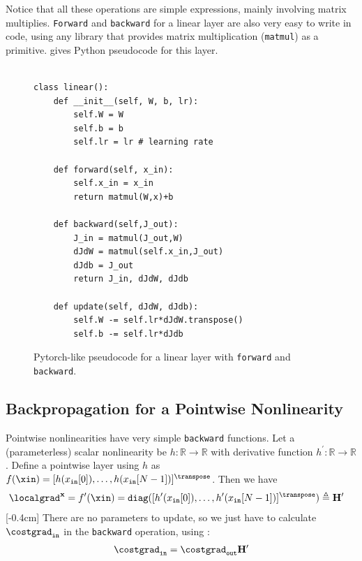 Notice that all these operations are simple expressions, mainly involving matrix multiplies. \texttt{Forward} and \texttt{backward} for a linear layer are also very easy to write in code, using any library that provides matrix multiplication (\texttt{matmul}) as a primitive. \Fig{\ref{fig:backpropagation:backprop_code}} gives Python pseudocode for this layer.
\begin{figure}[h]
\begin{minipage}{1.0\linewidth}
\begin{verbatim}

class linear():
    def __init__(self, W, b, lr):
        self.W = W
        self.b = b
        self.lr = lr # learning rate
        
    def forward(self, x_in):
        self.x_in = x_in
        return matmul(W,x)+b
    
    def backward(self,J_out):
        J_in = matmul(J_out,W)
        dJdW = matmul(self.x_in,J_out)
        dJdb = J_out
        return J_in, dJdW, dJdb
    
    def update(self, dJdW, dJdb):
        self.W -= self.lr*dJdW.transpose()
        self.b -= self.lr*dJdb
\end{verbatim}
\end{minipage}
\caption{Pytorch-like pseudocode for a linear layer with \texttt{forward} and \texttt{backward}.}
\label{fig:backpropagation:backprop_code}
\end{figure}


\subsection{Backpropagation for a Pointwise Nonlinearity}

Pointwise nonlinearities have very simple \texttt{backward} functions. Let a (parameterless) scalar nonlinearity be $h: \mathbb{R} \rightarrow \mathbb{R}$ with derivative function $h^{\prime}: \mathbb{R} \rightarrow \mathbb{R}$. Define a  pointwise layer using $h$ as $f(\xin) = [h(x_{\texttt{in}}[0]), \ldots, h(x_{\texttt{in}}[N-1])]^\transpose$. Then we have
\begin{align}
    \localgrad^{\mathbf{x}} &= f^{\prime}(\xin) = \texttt{diag}([h^\prime(x_{\texttt{in}}[0]), \ldots, h^\prime(x_{\texttt{in}}[N-1])]^\transpose) \triangleq \mathbf{H}^\prime
\end{align}
[-0.4cm]
There are no parameters to update, so we just have to calculate $\costgrad_{\texttt{in}}$ in the \texttt{backward} operation, using \eqn{\ref{eqn:backpropagation:backward}}:
\begin{align}
    \costgrad_{\texttt{in}} = \costgrad_{\texttt{out}}\mathbf{H}^\prime
\end{align}

